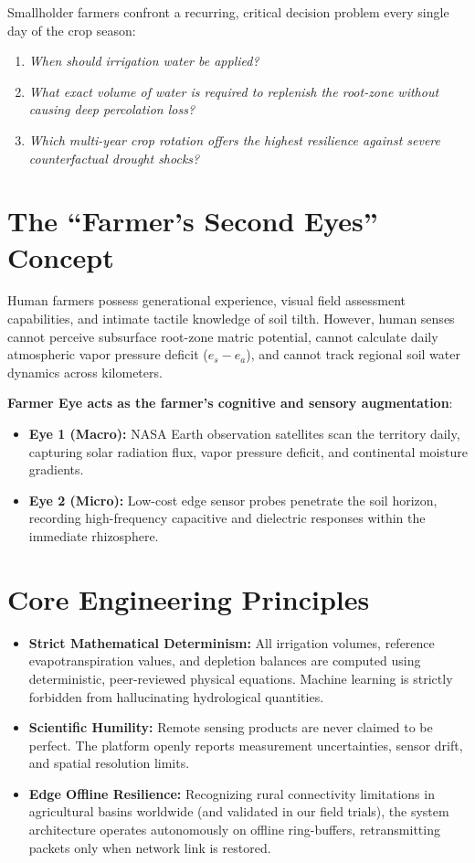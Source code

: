 \documentclass[11pt,a4paper,oneside]{report}
\begin{document}
Smallholder farmers confront a recurring, critical decision problem every single day of the crop season:
\begin{enumerate}
    \item \textit{When should irrigation water be applied?}
    \item \textit{What exact volume of water is required to replenish the root-zone without causing deep percolation loss?}
    \item \textit{Which multi-year crop rotation offers the highest resilience against severe counterfactual drought shocks?}
\end{enumerate}

\section{The ``Farmer's Second Eyes'' Concept}
Human farmers possess generational experience, visual field assessment capabilities, and intimate tactile knowledge of soil tilth. However, human senses cannot perceive subsurface root-zone matric potential, cannot calculate daily atmospheric vapor pressure deficit ($e_s - e_a$), and cannot track regional soil water dynamics across kilometers. 

\textbf{Farmer Eye acts as the farmer's cognitive and sensory augmentation}:
\begin{itemize}[leftmargin=*]
    \item \textbf{Eye 1 (Macro):} NASA Earth observation satellites scan the territory daily, capturing solar radiation flux, vapor pressure deficit, and continental moisture gradients.
    \item \textbf{Eye 2 (Micro):} Low-cost edge sensor probes penetrate the soil horizon, recording high-frequency capacitive and dielectric responses within the immediate rhizosphere.
\end{itemize}

\section{Core Engineering Principles}
\begin{itemize}[leftmargin=*]
    \item \textbf{Strict Mathematical Determinism:} All irrigation volumes, reference evapotranspiration values, and depletion balances are computed using deterministic, peer-reviewed physical equations. Machine learning is strictly forbidden from hallucinating hydrological quantities.
    \item \textbf{Scientific Humility:} Remote sensing products are never claimed to be perfect. The platform openly reports measurement uncertainties, sensor drift, and spatial resolution limits.
    \item \textbf{Edge Offline Resilience:} Recognizing rural connectivity limitations in agricultural basins worldwide (and validated in our field trials), the system architecture operates autonomously on offline ring-buffers, retransmitting packets only when network link is restored.
\end{itemize}
\end{document}
